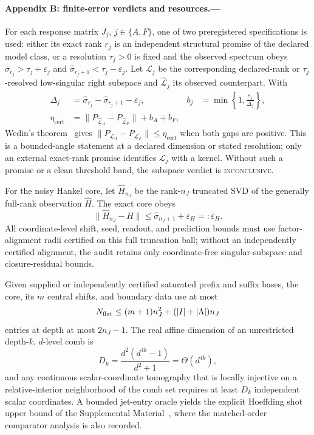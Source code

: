 \documentclass[aps,prl,reprint,superscriptaddress,nofootinbib]{revtex4-2}
\newcommand{\cert}{\mathrm{cert}}
\begin{document}
\paragraph{Appendix B: finite-error verdicts and resources.---}
\label{app:errors}
For each response matrix $J_j$, $j\in\{A,F\}$, one of two preregistered specifications is used: either its exact rank $r_j$ is an independent structural promise of the declared model class, or a resolution $\tau_j>0$ is fixed and the observed spectrum obeys $\widehat\sigma_{r_j}>\tau_j+\varepsilon_j$ and $\widehat\sigma_{r_j+1}<\tau_j-\varepsilon_j$.  Let $\mathcal L_j$ be the corresponding declared-rank or $\tau_j$-resolved low-singular right subspace and $\widehat{\mathcal L}_j$ its observed counterpart.  With
\begin{align}
 \Delta_j&=\widehat\sigma_{r_j}-\widehat\sigma_{r_j+1}-\varepsilon_j,
 &b_j&=\min\!\left\{1,\frac{\varepsilon_j}{\Delta_j}\right\},\nonumber\\
 \eta_{\cert}&=\|P_{\widehat{\mathcal L}_A}-P_{\widehat{\mathcal L}_F}\|+b_A+b_F,
 \label{eq:theoremP}
\end{align}
Wedin's theorem~\cite{Wedin1972} gives
$\|P_{\mathcal L_A}-P_{\mathcal L_F}\|\le\eta_{\cert}$ when both gaps are positive.  This is a bounded-angle statement at a declared dimension or stated resolution; only an external exact-rank promise identifies $\mathcal L_j$ with a kernel.  Without such a promise or a clean threshold band, the subspace verdict is \textsc{inconclusive}.

For the noisy Hankel core, let $\widehat H_{n_J}$ be the rank-$n_J$ truncated SVD of the generally full-rank observation $\widehat H$.  The exact core obeys
\begin{equation}
 \|\widehat H_{n_J}-H\|
 \le\widehat\sigma_{n_J+1}+\varepsilon_H
 =:\overline\varepsilon_H.
 \label{eq:truncated-core-main}
\end{equation}
All coordinate-level shift, seed, readout, and prediction bounds must use factor-alignment radii certified on this full truncation ball; without an independently certified alignment, the audit retains only coordinate-free singular-subspace and closure-residual bounds.

Given supplied or independently certified saturated prefix and suffix bases, the core, its $m$ central shifts, and boundary data use at most
\begin{equation}
 N_{\rm flat}\le(m+1)n_J^2+(|I|+|\Lambda|)n_J
 \label{eq:entries}
\end{equation}
entries at depth at most $2n_J-1$.  The real affine dimension of an unrestricted depth-$k$, $d$-level comb is
\begin{equation}
 D_k=\frac{d^2(d^{4k}-1)}{d^2+1}=\Theta(d^{4k}),
 \label{eq:comb-dim}
\end{equation}
and any continuous scalar-coordinate tomography that is locally injective on a relative-interior neighborhood of the comb set requires at least $D_k$ independent scalar coordinates.  A bounded jet-entry oracle yields the explicit Hoeffding shot upper bound of the Supplemental Material~\cite{SupplementalMaterial}, where the matched-order comparator analysis is also recorded.
\end{document}
